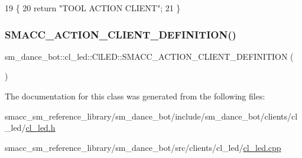 \begin{DoxyCode}
19 \{
20     \textcolor{keywordflow}{return} \textcolor{stringliteral}{"TOOL ACTION CLIENT"};
21 \}
\end{DoxyCode}
\mbox{\label{classsm__dance__bot_1_1cl__led_1_1ClLED_ab147c1770ddc2fad333427ae9f909011}} 
\subsubsection{\texorpdfstring{S\+M\+A\+C\+C\+\_\+\+A\+C\+T\+I\+O\+N\+\_\+\+C\+L\+I\+E\+N\+T\+\_\+\+D\+E\+F\+I\+N\+I\+T\+I\+O\+N()}{SMACC\_ACTION\_CLIENT\_DEFINITION()}}
{\footnotesize\ttfamily sm\+\_\+dance\+\_\+bot\+::cl\+\_\+led\+::\+Cl\+L\+E\+D\+::\+S\+M\+A\+C\+C\+\_\+\+A\+C\+T\+I\+O\+N\+\_\+\+C\+L\+I\+E\+N\+T\+\_\+\+D\+E\+F\+I\+N\+I\+T\+I\+ON (\begin{DoxyParamCaption}\item[{sm\+\_\+dance\+\_\+bot\+::\+L\+E\+D\+Control\+Action}]{ }\end{DoxyParamCaption})}



The documentation for this class was generated from the following files\+:\begin{DoxyCompactItemize}
\item 
smacc\+\_\+sm\+\_\+reference\+\_\+library/sm\+\_\+dance\+\_\+bot/include/sm\+\_\+dance\+\_\+bot/clients/cl\+\_\+led/\hyperlink{sm__dance__bot_2include_2sm__dance__bot_2clients_2cl__led_2cl__led_8h}{cl\+\_\+led.\+h}\item 
smacc\+\_\+sm\+\_\+reference\+\_\+library/sm\+\_\+dance\+\_\+bot/src/clients/cl\+\_\+led/\hyperlink{sm__dance__bot_2src_2clients_2cl__led_2cl__led_8cpp}{cl\+\_\+led.\+cpp}\end{DoxyCompactItemize}
